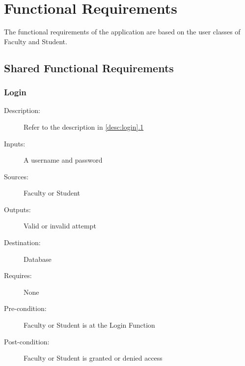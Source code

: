 %
%



\section{Functional Requirements}
The functional requirements of the application are based on the user classes of
Faculty and Student.
\subsection{Shared Functional Requirements}

\subsubsection{\large Login} 
\begin{boxed} %
\begin{description}
\item[Description:]
   Refer to the description in \autoref{desc:login}\hyperref[desc:login]{.1}
\item[Inputs:]
   A username and password
\item[Sources:]
   Faculty or Student
\item[Outputs:]
   Valid or invalid attempt
\item[Destination:]
   Database
\item[Requires:]
   None
\item[Pre-condition:]
   Faculty or Student is at the Login Function
\item[Post-condition:]
   Faculty or Student is granted or denied access
\end{description}
\end{boxed} %



